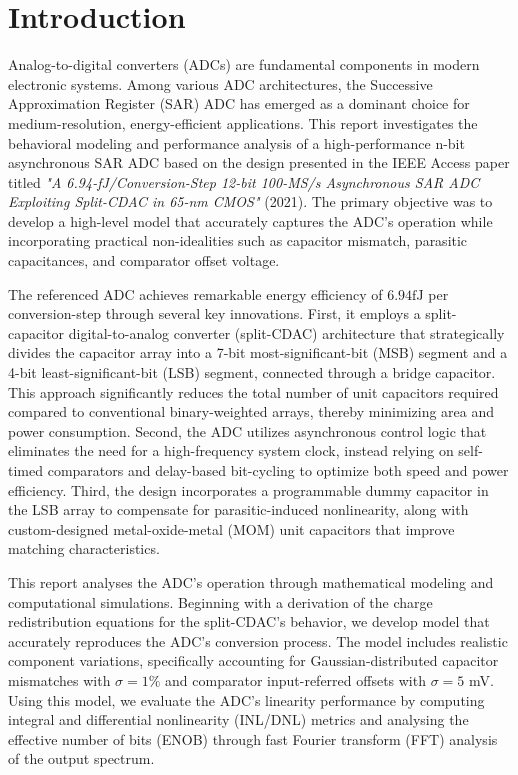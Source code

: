 \section{Introduction}

Analog-to-digital converters (ADCs) are fundamental components in modern electronic systems. Among various ADC architectures, the Successive Approximation Register (SAR) ADC has emerged as a dominant choice for medium-resolution, energy-efficient applications. This report investigates the behavioral modeling and performance analysis of a high-performance n-bit asynchronous SAR ADC based on the design presented in the IEEE Access paper titled \textit{"A 6.94-fJ/Conversion-Step 12-bit 100-MS/s Asynchronous SAR ADC Exploiting Split-CDAC in 65-nm CMOS"} (2021)\textsuperscript{\cite{paper}}. The primary objective was to develop a high-level model that accurately captures the ADC's operation while incorporating practical non-idealities such as capacitor mismatch, parasitic capacitances, and comparator offset voltage.

The referenced ADC achieves remarkable energy efficiency of $6.94 \si{\femto \joule}$ per conversion-step through several key innovations. First, it employs a split-capacitor digital-to-analog converter (split-CDAC) architecture that strategically divides the capacitor array into a 7-bit most-significant-bit (MSB) segment and a 4-bit least-significant-bit (LSB) segment, connected through a bridge capacitor. This approach significantly reduces the total number of unit capacitors required compared to conventional binary-weighted arrays, thereby minimizing area and power consumption. Second, the ADC utilizes asynchronous control logic that eliminates the need for a high-frequency system clock, instead relying on self-timed comparators and delay-based bit-cycling to optimize both speed and power efficiency. Third, the design incorporates a programmable dummy capacitor in the LSB array to compensate for parasitic-induced nonlinearity, along with custom-designed metal-oxide-metal (MOM) unit capacitors that improve matching characteristics.

This report analyses the ADC's operation through mathematical modeling and computational simulations. Beginning with a derivation of the charge redistribution equations for the split-CDAC's behavior, we develop model that accurately reproduces the ADC's conversion process. The model includes realistic component variations, specifically accounting for Gaussian-distributed capacitor mismatches with $\sigma = 1\%$ and comparator input-referred offsets with $\sigma = 5$ mV. Using this model, we evaluate the ADC's linearity performance by computing integral and differential nonlinearity (INL/DNL) metrics and analysing the effective number of bits (ENOB) through fast Fourier transform (FFT) analysis of the output spectrum.

